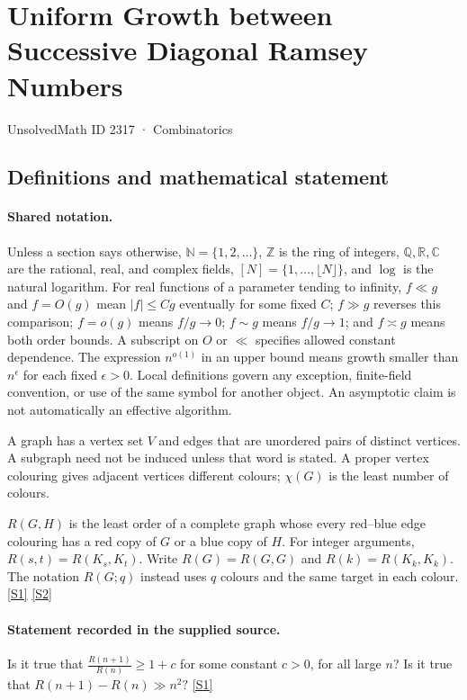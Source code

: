 \documentclass[11pt,a4paper]{article}
\newcommand{\N}{\mathbb{N}}
\newcommand{\Z}{\mathbb{Z}}
\newcommand{\Q}{\mathbb{Q}}
\newcommand{\R}{\mathbb{R}}
\newcommand{\C}{\mathbb{C}}
\newcommand{\sref}[2]{\hyperlink{source:#1:#2}{[S#2]}}
\begin{document}

\setcounter{section}{2316}

\section{Uniform Growth between Successive Diagonal Ramsey Numbers}\label{2317}

{\small\sffamily UnsolvedMath ID 2317 · Combinatorics}

\subsection{Definitions and mathematical statement}

\paragraph{Shared notation.}Unless a section says otherwise, $\N=\{1,2,\ldots\}$,
$\Z$ is the ring of integers, $\Q,\R,\C$ are the rational, real, and complex
fields, $[N]=\{1,\ldots,\lfloor N\rfloor\}$, and $\log$ is the natural
logarithm. For real functions of a parameter tending to infinity,
$f\ll g$ and $f=O(g)$ mean $|f|\leq Cg$ eventually for some fixed $C$;
$f\gg g$ reverses this comparison; $f=o(g)$ means $f/g\to0$;
$f\sim g$ means $f/g\to1$; and $f\asymp g$ means both order bounds.
A subscript on $O$ or $\ll$ specifies allowed constant dependence.
The expression $n^{o(1)}$ in an upper bound means growth smaller than
$n^\epsilon$ for each fixed $\epsilon>0$. Local definitions govern any
exception, finite-field convention, or use of the same symbol for another
object. An asymptotic claim is not automatically an effective algorithm.



A graph has a vertex set $V$ and edges that are unordered pairs of distinct vertices. A subgraph need not be induced unless that word is stated. A proper vertex colouring gives adjacent vertices different colours; $\chi(G)$ is the least number of colours.

$R(G,H)$ is the least order of a complete graph whose every red--blue edge colouring has a red copy of $G$ or a blue copy of $H$. For integer arguments, $R(s,t)=R(K_s,K_t)$. Write $R(G)=R(G,G)$ and $R(k)=R(K_k,K_k)$. The notation $R(G;q)$ instead uses $q$ colours and the same target in each colour. \sref{2317}{1} \sref{2317}{2}

\paragraph{Statement recorded in the supplied source.}
Is it true that $ \frac{R(n+1)}{R(n)}\geq 1+c $ for some constant $c>0$, for all large $n$? Is it true that $ R(n+1)-R(n) \gg n^2? $ \sref{2317}{1}
\end{document}

